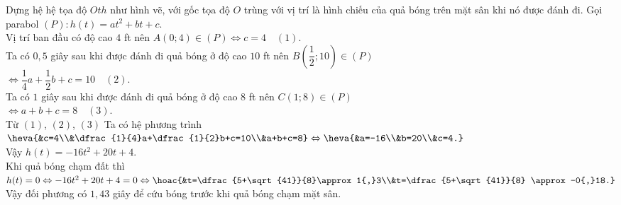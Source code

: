 \begin{ex}
{\begin{center}
		\end{center}
		Dựng hệ hệ tọa độ $Oth$ như hình vẽ, với gốc tọa độ $O$ trùng với vị trí là hình chiếu của quả bóng trên mặt sân khi nó được đánh đi.
		Gọi parabol $(P) \colon h(t)=at^2+bt+c$.\\
		Vị trí ban đầu có độ cao $4$ ft nên $A(0;4) \in (P) \Leftrightarrow c=4 \quad (1)$.\\
		Ta có $0{,}5$ giây sau khi được đánh đi quả bóng ở độ cao $10$ ft nên $B\left(\dfrac{1}{2};10\right) \in (P)$ \\
		$\Leftrightarrow \dfrac{1}{4}a+\dfrac{1}{2}b+c=10 \quad (2)$.\\
		Ta có $1$ giây sau khi được đánh đi quả bóng ở độ cao $8$ ft nên $C(1;8)\in (P)$\\
		$ \Leftrightarrow a+b+c=8 \quad (3)$.\\
		Từ $(1)$, $(2)$, $(3)$ Ta có hệ phương trình 
		$\heva{&c=4\\&\dfrac{1}{4}a+\dfrac{1}{2}b+c=10\\&a+b+c=8} \Leftrightarrow \heva{&a=-16\\&b=20\\&c=4.}$\\
		Vậy $h(t)=-16t^2+20t+4$.\\
		Khi quả bóng chạm đất thì $h(t)=0 \Leftrightarrow -16t^2+20t+4=0 \Leftrightarrow \hoac{&t=\dfrac{5+\sqrt{41}}{8}\approx 1{,}3\\&t=\dfrac{5+\sqrt{41}}{8} \approx -0{,}18.}$\\
		Vậy đối phương có $1{,}43$ giây để cứu bóng trước khi quả bóng chạm mặt sân.
	}
\end{ex}


